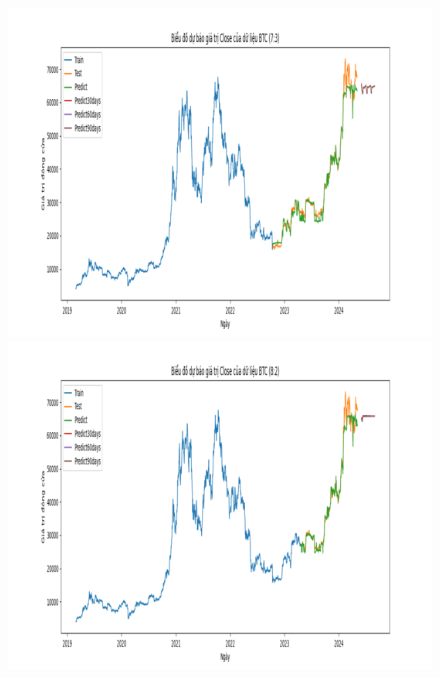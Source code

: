 \documentclass[conference]{IEEEtran}
\begin{document}
\begin{figure}[H]
    \centering
    \begin{minipage}{0.15\textwidth}
    \centering
    \includegraphics[width=1\textwidth]{Figure/RandomForest_BTC_73.png}
    \end{minipage}
    \hfill
    \begin{minipage}{0.15\textwidth}
    \centering
    \includegraphics[width=1\textwidth]{Figure/RandomForest_BTC_82.png}
    \end{minipage}
    \hfill
    \begin{minipage}{0.15\textwidth}
    \centering

\end{minipage}
\end{figure}
\end{document}
